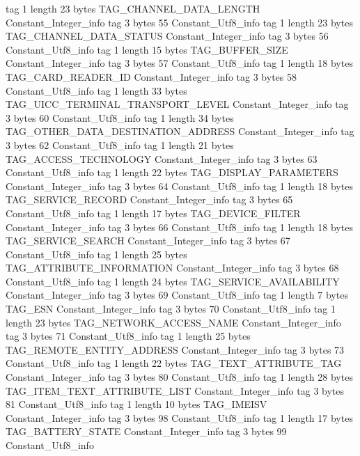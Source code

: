 {{{			tag	1
			length	23
			bytes	TAG_CHANNEL_DATA_LENGTH
		}
		Constant_Integer_info {
			tag	3
			bytes	55
		}
		Constant_Utf8_info {
			tag	1
			length	23
			bytes	TAG_CHANNEL_DATA_STATUS
		}
		Constant_Integer_info {
			tag	3
			bytes	56
		}
		Constant_Utf8_info {
			tag	1
			length	15
			bytes	TAG_BUFFER_SIZE
		}
		Constant_Integer_info {
			tag	3
			bytes	57
		}
		Constant_Utf8_info {
			tag	1
			length	18
			bytes	TAG_CARD_READER_ID
		}
		Constant_Integer_info {
			tag	3
			bytes	58
		}
		Constant_Utf8_info {
			tag	1
			length	33
			bytes	TAG_UICC_TERMINAL_TRANSPORT_LEVEL
		}
		Constant_Integer_info {
			tag	3
			bytes	60
		}
		Constant_Utf8_info {
			tag	1
			length	34
			bytes	TAG_OTHER_DATA_DESTINATION_ADDRESS
		}
		Constant_Integer_info {
			tag	3
			bytes	62
		}
		Constant_Utf8_info {
			tag	1
			length	21
			bytes	TAG_ACCESS_TECHNOLOGY
		}
		Constant_Integer_info {
			tag	3
			bytes	63
		}
		Constant_Utf8_info {
			tag	1
			length	22
			bytes	TAG_DISPLAY_PARAMETERS
		}
		Constant_Integer_info {
			tag	3
			bytes	64
		}
		Constant_Utf8_info {
			tag	1
			length	18
			bytes	TAG_SERVICE_RECORD
		}
		Constant_Integer_info {
			tag	3
			bytes	65
		}
		Constant_Utf8_info {
			tag	1
			length	17
			bytes	TAG_DEVICE_FILTER
		}
		Constant_Integer_info {
			tag	3
			bytes	66
		}
		Constant_Utf8_info {
			tag	1
			length	18
			bytes	TAG_SERVICE_SEARCH
		}
		Constant_Integer_info {
			tag	3
			bytes	67
		}
		Constant_Utf8_info {
			tag	1
			length	25
			bytes	TAG_ATTRIBUTE_INFORMATION
		}
		Constant_Integer_info {
			tag	3
			bytes	68
		}
		Constant_Utf8_info {
			tag	1
			length	24
			bytes	TAG_SERVICE_AVAILABILITY
		}
		Constant_Integer_info {
			tag	3
			bytes	69
		}
		Constant_Utf8_info {
			tag	1
			length	7
			bytes	TAG_ESN
		}
		Constant_Integer_info {
			tag	3
			bytes	70
		}
		Constant_Utf8_info {
			tag	1
			length	23
			bytes	TAG_NETWORK_ACCESS_NAME
		}
		Constant_Integer_info {
			tag	3
			bytes	71
		}
		Constant_Utf8_info {
			tag	1
			length	25
			bytes	TAG_REMOTE_ENTITY_ADDRESS
		}
		Constant_Integer_info {
			tag	3
			bytes	73
		}
		Constant_Utf8_info {
			tag	1
			length	22
			bytes	TAG_TEXT_ATTRIBUTE_TAG
		}
		Constant_Integer_info {
			tag	3
			bytes	80
		}
		Constant_Utf8_info {
			tag	1
			length	28
			bytes	TAG_ITEM_TEXT_ATTRIBUTE_LIST
		}
		Constant_Integer_info {
			tag	3
			bytes	81
		}
		Constant_Utf8_info {
			tag	1
			length	10
			bytes	TAG_IMEISV
		}
		Constant_Integer_info {
			tag	3
			bytes	98
		}
		Constant_Utf8_info {
			tag	1
			length	17
			bytes	TAG_BATTERY_STATE
		}
		Constant_Integer_info {
			tag	3
			bytes	99
		}
		Constant_Utf8_info {
}}}
